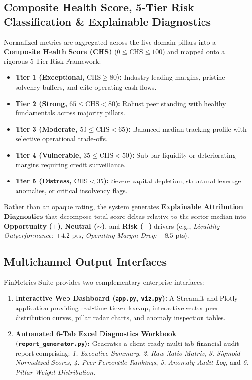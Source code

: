 \subsection{Composite Health Score, 5-Tier Risk Classification \& Explainable Diagnostics}
Normalized metrics are aggregated across the five domain pillars into a \textbf{Composite Health Score (CHS)} ($0 \le \text{CHS} \le 100$) and mapped onto a rigorous 5-Tier Risk Framework:
\begin{itemize}
    \item \textbf{Tier 1 (Exceptional, $\text{CHS} \ge 80$):} Industry-leading margins, pristine solvency buffers, and elite operating cash flows.
    \item \textbf{Tier 2 (Strong, $65 \le \text{CHS} < 80$):} Robust peer standing with healthy fundamentals across majority pillars.
    \item \textbf{Tier 3 (Moderate, $50 \le \text{CHS} < 65$):} Balanced median-tracking profile with selective operational trade-offs.
    \item \textbf{Tier 4 (Vulnerable, $35 \le \text{CHS} < 50$):} Sub-par liquidity or deteriorating margins requiring credit surveillance.
    \item \textbf{Tier 5 (Distress, $\text{CHS} < 35$):} Severe capital depletion, structural leverage anomalies, or critical insolvency flags.
\end{itemize}
Rather than an opaque rating, the system generates \textbf{Explainable Attribution Diagnostics} that decompose total score deltas relative to the sector median into \textbf{Opportunity ($+$)}, \textbf{Neutral ($\sim$)}, and \textbf{Risk ($-$)} drivers (e.g., \textit{Liquidity Outperformance: $+4.2\text{ pts}$; Operating Margin Drag: $-8.5\text{ pts}$}).

\subsection{Multichannel Output Interfaces}
FinMetrics Suite provides two complementary enterprise interfaces:
\begin{enumerate}
    \item \textbf{Interactive Web Dashboard (\texttt{app.py}, \texttt{viz.py}):} A Streamlit and Plotly application providing real-time ticker lookup, interactive sector peer distribution curves, pillar radar charts, and anomaly inspection tables.
    \item \textbf{Automated 6-Tab Excel Diagnostics Workbook (\texttt{report\_generator.py}):} Generates a client-ready multi-tab financial audit report comprising: \textit{1. Executive Summary}, \textit{2. Raw Ratio Matrix}, \textit{3. Sigmoid Normalized Scores}, \textit{4. Peer Percentile Rankings}, \textit{5. Anomaly Audit Log}, and \textit{6. Pillar Weight Distribution}.
\end{enumerate}
